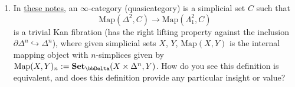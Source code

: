 \documentclass{amsart}
\theoremstyle{plain}
\theoremstyle{definition}
\newcommand{\Set}{\mbf{Set}}
\newcommand{\Map}{\mathrm{Map}}
\newcommand{\0}{\mathbf{0}}
\newcommand{\into}{\hookrightarrow}
\newcommand{\mbf}[1]{\mathbf{#1}}
\renewcommand{\(}{\left(}
\renewcommand{\)}{\right)}
\begin{document}
\begin{enumerate}[listparindent=\parindent,parsep=5pt]
  \item In \href{https://people.mpim-bonn.mpg.de/scholze/SixFunctors.pdf}{these notes}, an $\infty$-category (quasicategory) is a simplicial set $C$ such that
  \[\Map(\Delta^2,C)\to\Map(\Lambda_1^2,C)\]
  is a trivial Kan fibration (has the right lifting property against the inclusion $\partial\Delta^n\into\Delta^n$), where given simplicial sets $X$, $Y$, $\Map(X,Y)$ is the internal mapping object with $n$-simplices given by
  $\Map(X,Y)_n:=\Set_\bbDelta(X\times\Delta^n,Y)$. How do you see this definition is equivalent, and does this definition provide any particular insight or value?

\end{enumerate}
\end{document}
